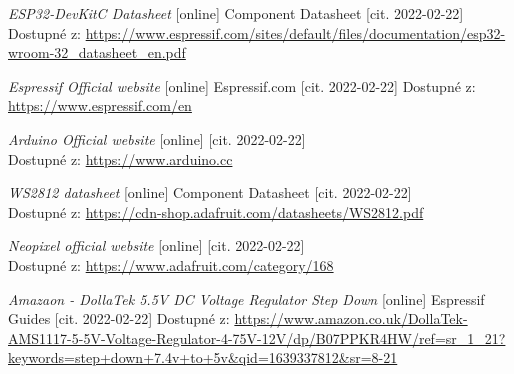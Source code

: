  \newpage

 \label{liter}
 \begin{thebibliography}{99}







\textit{ESP32-DevKitC Datasheet} [online] Component Datasheet [cit. 2022-02-22] 
\\Dostupné z: \url{https://www.espressif.com/sites/default/files/documentation/esp32-wroom-32_datasheet_en.pdf}

\textit{Espressif Official website} [online] Espressif.com [cit. 2022-02-22] 
Dostupné z:\\ \url{https://www.espressif.com/en}

\textit{Arduino Official website} [online] [cit. 2022-02-22] \\
Dostupné z: \url{https://www.arduino.cc}

\textit{WS2812 datasheet} [online] Component Datasheet [cit. 2022-02-22] \\
Dostupné z: \url{https://cdn-shop.adafruit.com/datasheets/WS2812.pdf}

\textit{Neopixel official website} [online] [cit. 2022-02-22] \\
Dostupné z: \url{https://www.adafruit.com/category/168}

\textit{Amazaon - DollaTek 5.5V DC Voltage Regulator Step Down } [online] Espressif Guides [cit. 2022-02-22] Dostupné z: \url{https://www.amazon.co.uk/DollaTek-AMS1117-5-5V-Voltage-Regulator-4-75V-12V/dp/B07PPKR4HW/ref=sr_1_21?keywords=step+down+7.4v+to+5v&qid=1639337812&sr=8-21}


\end{thebibliography}
